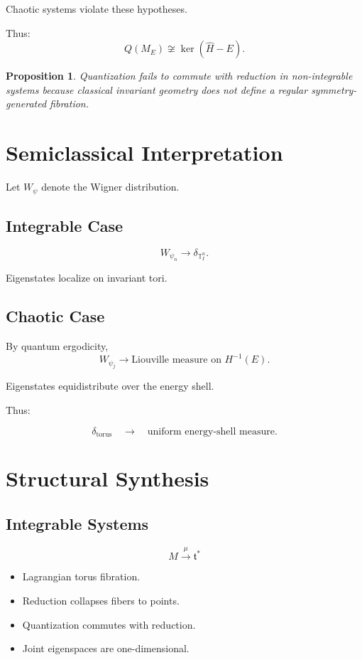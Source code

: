 \documentclass[11pt]{article}
\newtheorem{proposition}{Proposition}
\begin{document}
Chaotic systems violate these hypotheses.

Thus:
\[
Q(M_E) \not\cong \ker(\hat H - E).
\]

\begin{proposition}
Quantization fails to commute with reduction in non-integrable systems because classical invariant geometry does not define a regular symmetry-generated fibration.
\end{proposition}

\section{Semiclassical Interpretation}

Let $W_{\psi}$ denote the Wigner distribution.

\subsection{Integrable Case}

\[
W_{\psi_n} \to \delta_{\mathbb{T}^n_I}.
\]

Eigenstates localize on invariant tori.

\subsection{Chaotic Case}

By quantum ergodicity,
\[
W_{\psi_j} \to \text{Liouville measure on } H^{-1}(E).
\]

Eigenstates equidistribute over the energy shell.

Thus:

\[
\delta_{\text{torus}}
\quad \longrightarrow \quad
\text{uniform energy-shell measure}.
\]

\section{Structural Synthesis}

\subsection*{Integrable Systems}

\[
M \xrightarrow{\mu} \mathfrak{t}^*
\]

\begin{itemize}
\item Lagrangian torus fibration.
\item Reduction collapses fibers to points.
\item Quantization commutes with reduction.
\item Joint eigenspaces are one-dimensional.
\end{itemize}
\end{document}
